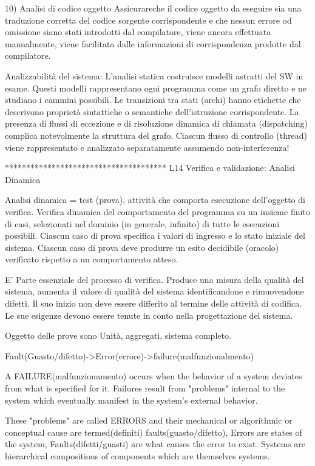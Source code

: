 \documentclass{report}
\begin{document}
10) Analisi di codice oggetto
Assicurareche il codice oggetto da eseguire sia una traduzione corretta del codice sorgente corrispondente e che nessun errore od omissione siano stati introdotti dal compilatore, viene ancora effettuata manualmente, viene facilitata dalle informazioni di corrispondenza prodotte dal compilatore.


Analizzabilità del sistema:
L’analisi statica costruisce modelli astratti del SW in esame.
Questi modelli rappresentano ogni programma come un grafo diretto e ne studiano i cammini possibili.
Le transizioni tra stati (archi) hanno etichette che descrivono proprietà sintattiche o semantiche dell’istruzione corrispondente.
La presenza di flussi di eccezione e di risoluzione dinamica di chiamata (dispatching) complica notevolmente la struttura del grafo.
Ciascun flusso di controllo (thread) viene rappresentato e analizzato separatamente assumendo non-interferenza!

**************************************
L14 Verifica e validazione: Analisi Dinamica

Analisi dinamica = test (prova), attività che comporta esecuzione dell’oggetto di verifica.
Verifica dinamica del comportamento del programma su un insieme finito di casi, selezionati nel dominio (in generale, infinito) di tutte le esecuzioni possibili. Ciascun caso di prova specifica i valori di ingresso e lo stato iniziale del sistema.
Ciascun caso di prova deve produrre un esito decidibile (oracolo) verificato rispetto a un comportamento atteso.

E' Parte essenziale del processo di verifica. Produce una misura della qualità del sistema, aumenta il valore di qualità del sistema identificandone e rimuovendone difetti.
Il suo inizio non deve essere differito al termine delle attività di codifica.  Le sue esigenze devono essere tenute in conto nella progettazione del sistema.

Oggetto delle prove sono Unità, aggregati, sistema completo.

Fault(Guasto/difetto)->Error(errore)->failure(malfunzionalmento)

A FAILURE(malfunzionamento) occurs when the behavior of a system deviates from what is specified for it.  Failures result from "problems" internal to the system which eventually manifest in the system's external behavior.

These "problems" are called ERRORS and their mechanical or algorithmic or conceptual cause are termed(definiti) faults(guasto/difetto), Errors are states of the system, Faults(difetti/guasti) are what causes the error to exist.
Systems are hierarchical compositions of components which are themselves systems.
\end{document}
